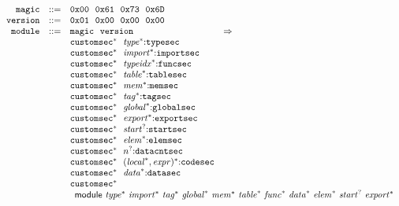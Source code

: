 $$
\begin{array}[t]{@{}lrrl@{}l@{}l@{}l@{}}
& {\mathtt{magic}} & ::= & \mathtt{0x00}~~\mathtt{0x61}~~\mathtt{0x73}~~\mathtt{0x6D} \\
& {\mathtt{version}} & ::= & \mathtt{0x01}~~\mathtt{0x00}~~\mathtt{0x00}~~\mathtt{0x00} \\
& {\mathtt{module}} & ::= & \begin{array}[t]{@{}l@{}} {\mathtt{magic}}~~{\mathtt{version}} \\
  {{\mathtt{customsec}}^\ast}~~{{\mathit{type}}^\ast}{:}{\mathtt{typesec}} \\
  {{\mathtt{customsec}}^\ast}~~{{\mathit{import}}^\ast}{:}{\mathtt{importsec}} \\
  {{\mathtt{customsec}}^\ast}~~{{\mathit{typeidx}}^\ast}{:}{\mathtt{funcsec}} \\
  {{\mathtt{customsec}}^\ast}~~{{\mathit{table}}^\ast}{:}{\mathtt{tablesec}} \\
  {{\mathtt{customsec}}^\ast}~~{{\mathit{mem}}^\ast}{:}{\mathtt{memsec}} \\
  {{\mathtt{customsec}}^\ast}~~{{\mathit{tag}}^\ast}{:}{\mathtt{tagsec}} \\
  {{\mathtt{customsec}}^\ast}~~{{\mathit{global}}^\ast}{:}{\mathtt{globalsec}} \\
  {{\mathtt{customsec}}^\ast}~~{{\mathit{export}}^\ast}{:}{\mathtt{exportsec}} \\
  {{\mathtt{customsec}}^\ast}~~{{\mathit{start}}^?}{:}{\mathtt{startsec}} \\
  {{\mathtt{customsec}}^\ast}~~{{\mathit{elem}}^\ast}{:}{\mathtt{elemsec}} \\
  {{\mathtt{customsec}}^\ast}~~{n^?}{:}{\mathtt{datacntsec}} \\
  {{\mathtt{customsec}}^\ast}~~{({{\mathit{local}}^\ast}, {\mathit{expr}})^\ast}{:}{\mathtt{codesec}} \\
  {{\mathtt{customsec}}^\ast}~~{{\mathit{data}}^\ast}{:}{\mathtt{datasec}} \\
  {{\mathtt{customsec}}^\ast} \end{array} & \quad\Rightarrow\quad{} & & \\
&&& \multicolumn{4}{@{}l@{}}{\quad
\begin{array}[t]{@{}l@{}l@{}l@{}}
\mathsf{module}~{{\mathit{type}}^\ast}~{{\mathit{import}}^\ast}~{{\mathit{tag}}^\ast}~{{\mathit{global}}^\ast}~{{\mathit{mem}}^\ast}~{{\mathit{table}}^\ast}~{{\mathit{func}}^\ast}~{{\mathit{data}}^\ast}~{{\mathit{elem}}^\ast}~{{\mathit{start}}^?}~{{\mathit{export}}^\ast} & & \\

\end{array}}
\end{array}$$
